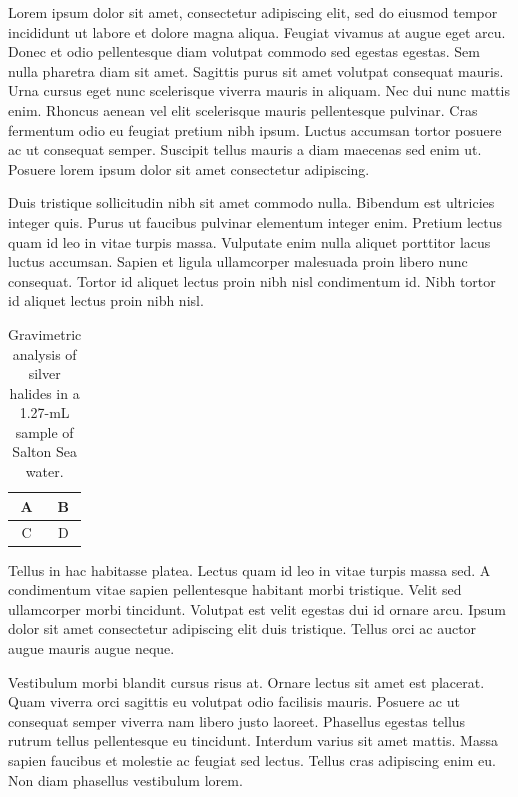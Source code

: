 \documentclass[letterpaper,\myfontsize]{article}
\begin{document}
Lorem ipsum dolor sit amet, consectetur adipiscing elit, sed do eiusmod tempor incididunt ut labore et dolore magna aliqua. Feugiat vivamus at augue eget arcu. Donec et odio pellentesque diam volutpat commodo sed egestas egestas. Sem nulla pharetra diam sit amet. Sagittis purus sit amet volutpat consequat mauris. Urna cursus eget nunc scelerisque viverra mauris in aliquam. Nec dui nunc mattis enim. Rhoncus aenean vel elit scelerisque mauris pellentesque pulvinar. Cras fermentum odio eu feugiat pretium nibh ipsum. Luctus accumsan tortor posuere ac ut consequat semper. Suscipit tellus mauris a diam maecenas sed enim ut. Posuere lorem ipsum dolor sit amet consectetur adipiscing. 

Duis tristique sollicitudin nibh sit amet commodo nulla. Bibendum est ultricies integer quis. Purus ut faucibus pulvinar elementum integer enim. Pretium lectus quam id leo in vitae turpis massa. Vulputate enim nulla aliquet porttitor lacus luctus accumsan. Sapien et ligula ullamcorper malesuada proin libero nunc consequat. Tortor id aliquet lectus proin nibh nisl condimentum id. Nibh tortor id aliquet lectus proin nibh nisl.

\begin{table}[htbp]
\centering
\caption{Gravimetric analysis of silver halides in a 1.27-mL sample of Salton Sea water.}
\begin{tabular}{cc}
\toprule
A & B \\
\midrule
C & D \\
\bottomrule      
\end{tabular}
\label{tabgrav}
\end{table}

Tellus in hac habitasse platea. Lectus quam id leo in vitae turpis massa sed. A condimentum vitae sapien pellentesque habitant morbi tristique. Velit sed ullamcorper morbi tincidunt. Volutpat est velit egestas dui id ornare arcu. Ipsum dolor sit amet consectetur adipiscing elit duis tristique. Tellus orci ac auctor augue mauris augue neque. 

Vestibulum morbi blandit cursus risus at. Ornare lectus sit amet est placerat. Quam viverra orci sagittis eu volutpat odio facilisis mauris. Posuere ac ut consequat semper viverra nam libero justo laoreet. Phasellus egestas tellus rutrum tellus pellentesque eu tincidunt. Interdum varius sit amet mattis. Massa sapien faucibus et molestie ac feugiat sed lectus. Tellus cras adipiscing enim eu. Non diam phasellus vestibulum lorem.

\end{document}
